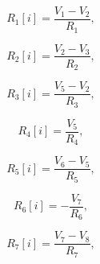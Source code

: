 \begin{equation}
  R_1[i] = \frac{V_1 - V_2}{R_1},
  \label{eq:ohm11}
\end{equation}

\begin{equation}
  R_2[i] = \frac{V_2 - V_3}{R_2},
  \label{eq:ohm12}
\end{equation}

\begin{equation}
  R_3[i] = \frac{V_5 - V_2}{R_3},
  \label{eq:ohm13}
\end{equation}

\begin{equation}
  R_4[i] = \frac{V_5}{R_4},
  \label{eq:ohm14}
\end{equation}

\begin{equation}
  R_5[i] = \frac{V_6 - V_5}{R_5},
  \label{eq:ohm15}
\end{equation}

\begin{equation}
  R_6[i] = -\frac{V_7}{R_6},
  \label{eq:ohm16}
\end{equation}

\begin{equation}
  R_7[i] = \frac{V_7 - V_8}{R_7},
  \label{eq:ohm17}
\end{equation}

